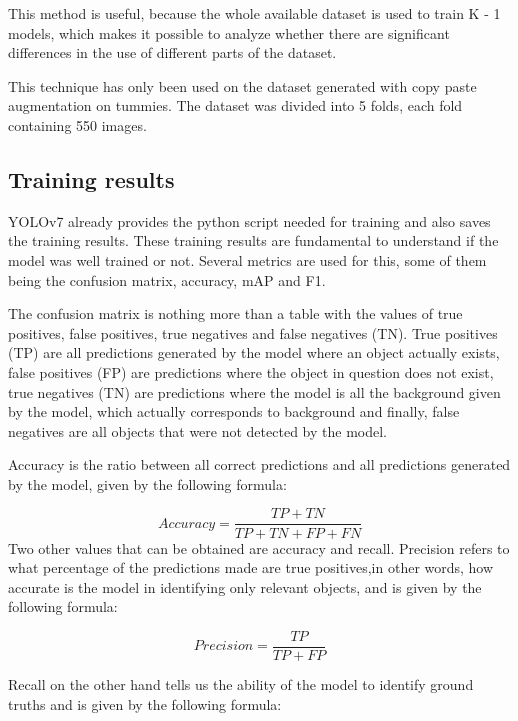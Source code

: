 This method is useful, because the whole available dataset is used to train K - 1 models, which makes it possible to analyze whether there are significant differences in the use of different parts of the dataset.

This technique has only been used on the dataset generated with copy paste augmentation on tummies. The dataset was divided into 5 folds, each fold containing 550 images.



\subsection{Training results}

YOLOv7 already provides the python script needed for training and also saves the training results. These training results are fundamental to understand if the model was well trained or not. Several metrics are used for this, some of them being the confusion matrix, accuracy, mAP and F1.

The confusion matrix is nothing more than a table with the values of true positives, false positives, true negatives and false negatives (TN). True positives (TP) are all predictions generated by the model where an object actually exists, false positives (FP) are predictions where the object in question does not exist, true negatives (TN) are predictions where the model is all the background given by the model, which actually corresponds to background and finally, false negatives are all objects that were not detected by the model.

Accuracy is the ratio between all correct predictions and all predictions generated by the model, given by the following formula:

\begin{equation}
     Accuracy = \frac{TP + TN}{TP + TN + FP + FN}
\end{equation}
Two other values that can be obtained are accuracy and recall\cite{yoloMetrics}. Precision refers to what percentage of the predictions made are true positives,in other words, how accurate is the model in identifying only relevant objects, and is given by the following formula:

\begin{equation}
     Precision = \frac{TP }{TP + FP}
\end{equation}

Recall on the other hand tells us the ability of the model to identify ground truths and is given by the following formula:

